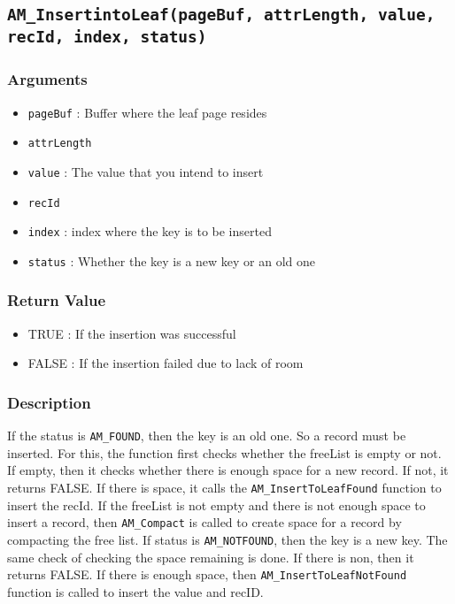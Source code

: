 \documentclass[a4paper, 12pt]{article}
\begin{document}
\subsection{\texttt{AM\_InsertintoLeaf(pageBuf, attrLength, value, recId, index, status)}}
\subsubsection{Arguments}
\begin{itemize}
	\item{\texttt{pageBuf} : Buffer where the leaf page resides}
	\item{\texttt{attrLength}}
	\item{\texttt{value} : The value that you intend to insert}
	\item{\texttt{recId}}
	\item{\texttt{index} : index where the key is to be inserted}
	\item{\texttt{status} : Whether the key is a new key or an old one}
\end{itemize}
\subsubsection{Return Value}
\begin{itemize}
	\item{TRUE : If the insertion was successful}
	\item{FALSE : If the insertion failed due to lack of room}
\end{itemize}
\subsubsection{Description}
If the status is \texttt{AM\_FOUND}, then the key is an old one. So a record must be inserted. For this, the function first checks whether the freeList is empty or not. If empty, then it checks whether there is enough space for a new record. If not, it returns FALSE. If there is space, it calls the \texttt{AM\_InsertToLeafFound} function to insert the recId. If the freeList is not empty and there is not enough space to insert a record, then \texttt{AM\_Compact} is called to create space for a record by compacting the free list. If status is \texttt{AM\_NOTFOUND}, then the key is a new key. The same check of checking the space remaining is done. If there is non, then it returns FALSE. If there is enough space, then \texttt{AM\_InsertToLeafNotFound} function is called to insert the value and recID.
\end{document}
